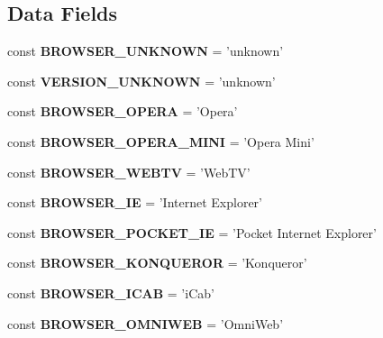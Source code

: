 \subsection*{Data Fields}
\begin{DoxyCompactItemize}
\item 
\hypertarget{class_browser_afcb177b13dc069e4c0f7c2cb5ae4598f}{
const {\bfseries BROWSER\_\-UNKNOWN} = 'unknown'}
\label{class_browser_afcb177b13dc069e4c0f7c2cb5ae4598f}

\item 
\hypertarget{class_browser_a8a2756a53ebfb2fe94eb622724e737e9}{
const {\bfseries VERSION\_\-UNKNOWN} = 'unknown'}
\label{class_browser_a8a2756a53ebfb2fe94eb622724e737e9}

\item 
\hypertarget{class_browser_a391725061466a7b7bab4dd6cf14a5466}{
const {\bfseries BROWSER\_\-OPERA} = 'Opera'}
\label{class_browser_a391725061466a7b7bab4dd6cf14a5466}

\item 
\hypertarget{class_browser_a07bc52b895504b8a4ec4028070779f7f}{
const {\bfseries BROWSER\_\-OPERA\_\-MINI} = 'Opera Mini'}
\label{class_browser_a07bc52b895504b8a4ec4028070779f7f}

\item 
\hypertarget{class_browser_aab3c6307bc84a84b01698b8901e2ec7f}{
const {\bfseries BROWSER\_\-WEBTV} = 'WebTV'}
\label{class_browser_aab3c6307bc84a84b01698b8901e2ec7f}

\item 
\hypertarget{class_browser_ab7f6492ec006df16cdf2bd0b38c2a8cb}{
const {\bfseries BROWSER\_\-IE} = 'Internet Explorer'}
\label{class_browser_ab7f6492ec006df16cdf2bd0b38c2a8cb}

\item 
\hypertarget{class_browser_ae9b3f527f760a62833b47f2a5837fab7}{
const {\bfseries BROWSER\_\-POCKET\_\-IE} = 'Pocket Internet Explorer'}
\label{class_browser_ae9b3f527f760a62833b47f2a5837fab7}

\item 
\hypertarget{class_browser_adae0245da4769c70d07eea12238a01c2}{
const {\bfseries BROWSER\_\-KONQUEROR} = 'Konqueror'}
\label{class_browser_adae0245da4769c70d07eea12238a01c2}

\item 
\hypertarget{class_browser_af35a1838332e2305a10cf9e1a48cab6e}{
const {\bfseries BROWSER\_\-ICAB} = 'iCab'}
\label{class_browser_af35a1838332e2305a10cf9e1a48cab6e}

\item 
\hypertarget{class_browser_aa13277818ec795d85d869a3e7d094ec8}{
const {\bfseries BROWSER\_\-OMNIWEB} = 'OmniWeb'}
\label{class_browser_aa13277818ec795d85d869a3e7d094ec8}


\end{DoxyCompactItemize}
